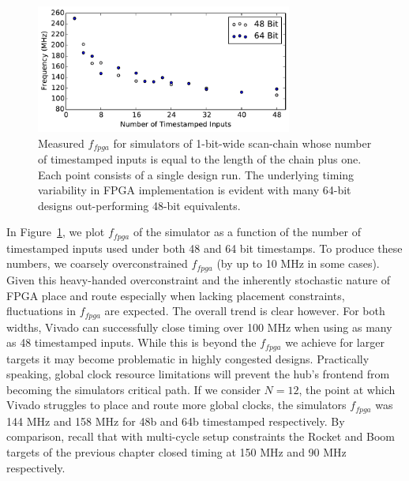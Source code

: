 \begin{figure}
    \centering
    \includegraphics[width=0.75\textwidth]{figures/pdes--hub-fmax-scaling.pdf}
    \caption{Measured $f_{fpga}$ for simulators of 1-bit-wide scan-chain whose
    number of timestamped inputs is equal to the length of the chain plus one. Each
    point consists of a single design run. The underlying timing
    variability in FPGA implementation is evident with many 64-bit designs
    out-performing 48-bit equivalents.}
    \label{fig:pdes-hub-fmax-scaling}
\end{figure}

In Figure~\ref{fig:pdes-hub-fmax-scaling}, we plot $f_{fpga}$ of the simulator as
a function of the number of timestamped inputs used under both 48 and 64 bit
timestamps. To produce these numbers, we coarsely overconstrained $f_{fpga}$ (by up to 10 MHz in some cases). Given this
heavy-handed overconstraint and the inherently stochastic nature of FPGA place
and route especially when lacking placement constraints, fluctuations in $f_{fpga}$ are expected. The overall trend is clear
however. For both widths, Vivado can successfully close timing over 100 MHz when using as many as 48 timestamped inputs. While this is beyond the $f_{fpga}$
we achieve for larger targets it may become problematic in highly congested designs. Practically speaking, global clock resource
limitations will prevent the hub's frontend from becoming the simulators
critical path. If we consider $N=12$, the point at which Vivado struggles to
place and route more global clocks, the simulators $f_{fpga}$ was 144 MHz and
158 MHz for 48b and 64b timestamped respectively. By comparison, recall that
with multi-cycle setup constraints the Rocket and Boom targets of the previous
chapter closed timing at 150 MHz and 90 MHz respectively.


